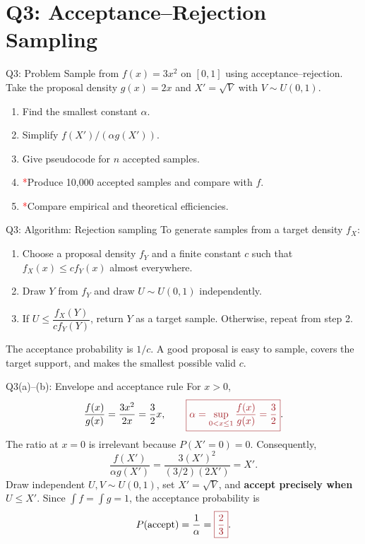 \documentclass{beamer}
\newcommand{\keytext}[1]{\textcolor{lecturekey}{\textbf{#1}}}
\newcommand{\keybox}[1]{\textcolor{lecturekey}{\boxed{#1}}}
\newcommand{\redstar}{\textcolor{red}{*}}
\begin{document}
\section[Q3]{Q3: Acceptance--Rejection Sampling}

\begin{frame}{Q3: Problem}
\small
Sample from $f(x)=3x^2$ on $[0,1]$ using acceptance--rejection. Take the proposal density $g(x)=2x$ and
$X'=\sqrt V$ with $V\sim U(0,1)$.
\begin{enumerate}
\item[(a)] Find the smallest constant $\alpha$.
\item[(b)] Simplify $f(X')/(\alpha g(X'))$.
\item[(c)] Give pseudocode for $n$ accepted samples.
\item[(d)] \redstar Produce 10,000 accepted samples and compare with $f$.
\item[(e)] \redstar Compare empirical and theoretical efficiencies.
\end{enumerate}
\end{frame}

\begin{frame}{Q3: Algorithm: Rejection sampling}
\small
To generate samples from a target density $f_X$:
\begin{enumerate}
\item Choose a proposal density $f_Y$ and a finite constant $c$ such that
      $f_X(x)\le c f_Y(x)$ almost everywhere.
\item Draw $Y$ from $f_Y$ and draw $U\sim U(0,1)$ independently.
\item If $U\le \dfrac{f_X(Y)}{c f_Y(Y)}$, return $Y$ as a target sample.
      Otherwise, repeat from step 2.
\end{enumerate}
The acceptance probability is $1/c$. A good proposal is easy to sample,
covers the target support, and makes the smallest possible valid $c$.
\end{frame}

\begin{frame}{Q3(a)--(b): Envelope and acceptance rule}
\small
For $x>0$,
\[
\frac{f(x)}{g(x)}=\frac{3x^2}{2x}=\frac32x,
\qquad
\keybox{\alpha=\sup_{0<x\leq1}\frac{f(x)}{g(x)}=\frac32}.
\]
The ratio at $x=0$ is irrelevant because $P(X'=0)=0$. Consequently,
\[
\frac{f(X')}{\alpha g(X')}
=\frac{3(X')^2}{(3/2)(2X')}=X'.
\]
Draw independent $U,V\sim U(0,1)$, set $X'=\sqrt V$, and
\keytext{accept precisely when $U\leq X'$}.
\medskip
Since $\int f=\int g=1$, the acceptance probability is
\[
P(\text{accept})=\frac1\alpha=\keybox{\frac23}.
\]
\end{frame}
\end{document}
